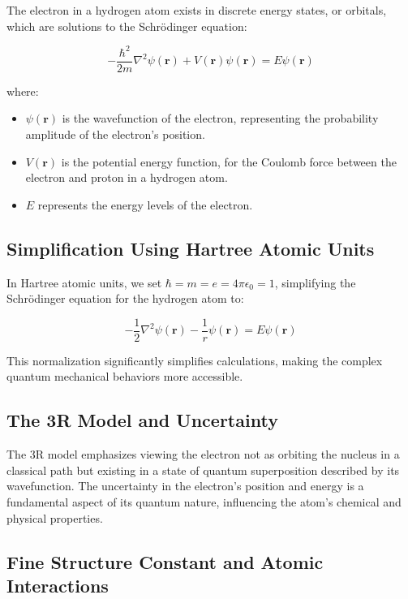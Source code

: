 \documentclass[12pt]{article}
\begin{document}
The electron in a hydrogen atom exists in discrete energy states, or orbitals, which are solutions to the Schrödinger equation:

\begin{equation}
    -\frac{\hbar^2}{2m}\nabla^2\psi(\mathbf{r}) + V(\mathbf{r})\psi(\mathbf{r}) = E\psi(\mathbf{r})
\end{equation}

where:
\begin{itemize}
    \item $\psi(\mathbf{r})$ is the wavefunction of the electron, representing the probability amplitude of the electron's position.
    \item $V(\mathbf{r})$ is the potential energy function, for the Coulomb force between the electron and proton in a hydrogen atom.
    \item $E$ represents the energy levels of the electron.
\end{itemize}

\subsection*{Simplification Using Hartree Atomic Units}

In Hartree atomic units, we set $\hbar = m = e = 4\pi\epsilon_0 = 1$, simplifying the Schrödinger equation for the hydrogen atom to:

\begin{equation}
    -\frac{1}{2}\nabla^2\psi(\mathbf{r}) - \frac{1}{r}\psi(\mathbf{r}) = E\psi(\mathbf{r})
\end{equation}

This normalization significantly simplifies calculations, making the complex quantum mechanical behaviors more accessible.

\subsection*{The 3R Model and Uncertainty}

The 3R model emphasizes viewing the electron not as orbiting the nucleus in a classical path but existing in a state of quantum superposition described by its wavefunction. The uncertainty in the electron's position and energy is a fundamental aspect of its quantum nature, influencing the atom's chemical and physical properties.

\subsection*{Fine Structure Constant and Atomic Interactions}
\end{document}
